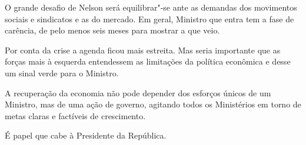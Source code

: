 \asterisc{}

O grande desafio de Nelson será equilibrar"-se ante as demandas dos
movimentos sociais e sindicatos e as do mercado. Em geral, Ministro que
entra tem a fase de carência, de pelo menos seis meses para mostrar a
que veio.

Por conta da crise a agenda ficou mais estreita. Mas seria importante
que as forças mais à esquerda entendessem as limitações da política
econômica e desse um sinal verde para o Ministro.

A recuperação da economia não pode depender dos esforços únicos de um
Ministro, mas de uma ação de governo, agitando todos os Ministérios em
torno de metas claras e factíveis de crescimento.

É papel que cabe à Presidente da República.
